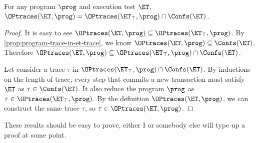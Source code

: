 \begin{proposition}
For any program $\prog$ and execution test $\ET$, $\OPtraces(\ET, \prog) = \OPtraces(\ET_{\top}, \prog) 
\cap \Confs(\ET)$.
\end{proposition}
\begin{proof}
    It is easy to see \(\OPtraces(\ET, \prog) \subseteq \OPtraces(\ET_\top, \prog) \).
    By \cref{prop:program-trace-in-et-trace}, we know \( \OPtraces(\ET, \prog) \subseteq \Confs(\ET)\).
    Therefore \(  \OPtraces(\ET, \prog) \subseteq \OPtraces(\ET_\top, \prog) \cap \Confs(\ET) \).

    Let consider a trace \( \tau \) in \( \OPtraces(\ET_\top, \prog) \cap \Confs(\ET) \).
    By inductions on the length of trace, 
    every step that commits a new transaction  must satisfy \( \ET \) as \( \tau \in \Confs(\ET) \).
    It also reduce the program \( \prog \) as \( \tau \in \OPtraces(\ET_\top, \prog) \).
    By the definition \( \OPtraces(\ET, \prog) \),
    we can construct the same trace \( \tau \),
    so \( \tau \in \OPtraces(\ET, \prog) \).
\end{proof}

\ac{These results should be easy to prove, either I or somebody else will type up a proof 
at some point.}

